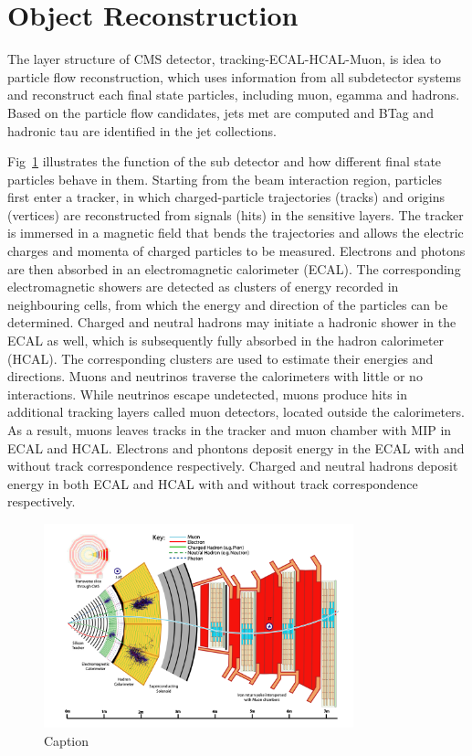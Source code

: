 
\section{Object Reconstruction}
\label{sec:cmsexperiment:reconstruction}

The layer structure of CMS detector, tracking-ECAL-HCAL-Muon, is idea to particle flow reconstruction, which uses information from all subdetector systems and reconstruct each final state particles, including muon, egamma and hadrons. Based on the particle flow candidates, jets met are computed and BTag and hadronic tau are identified in the jet collections. 

Fig~\ref{fig:cmsexperiment:reconstruction:pfa} illustrates the function of the sub detector and how different final state particles behave in them. Starting from the beam interaction region, particles first enter a tracker, in which charged-particle trajectories (tracks) and origins (vertices) are reconstructed from signals (hits) in the sensitive layers. The tracker is immersed in a magnetic field that bends the trajectories and allows the electric charges and momenta of charged particles to be measured. Electrons and photons are then absorbed in an electromagnetic calorimeter (ECAL). The corresponding electromagnetic showers are detected as clusters of energy recorded in neighbouring cells, from which the energy and direction of the particles can be determined. Charged and neutral hadrons may initiate a hadronic shower in the ECAL as well, which is subsequently fully absorbed in the hadron calorimeter (HCAL). The corresponding clusters are used to estimate their energies and directions. Muons and neutrinos traverse the calorimeters with little or no interactions. While neutrinos escape undetected, muons produce hits in additional tracking layers called muon detectors, located outside the calorimeters. As a result,  muons leaves tracks in the tracker and muon chamber with MIP in ECAL and HCAL. Electrons and phontons deposit energy in the ECAL with and without track correspondence respectively. Charged and neutral hadrons deposit energy in both ECAL and HCAL with and without track correspondence respectively. 

\begin{figure}[ht]
    \centering
    \includegraphics[width=0.8\textwidth]{chapters/CMSExperiment/sectionReconstruction/figures/pfa.png}
    \caption{Caption}
    \label{fig:cmsexperiment:reconstruction:pfa}
\end{figure}

